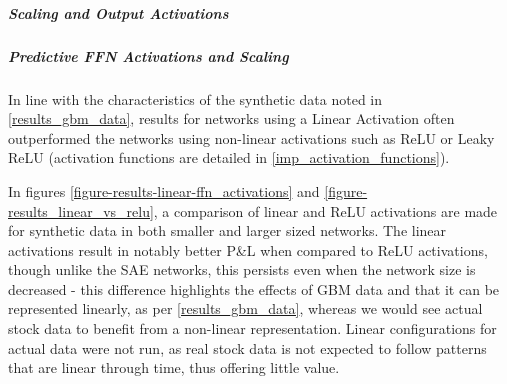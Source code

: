 \documentclass[a4paper,11pt,oneside]{article}
\theoremstyle{plain}
\theoremstyle{definition}
\begin{document}
\subparagraph{Scaling and Output Activations}\label{results_sae_activations_scaling}




















\subparagraph{Predictive FFN Activations and Scaling}

In line with the characteristics of the synthetic data noted in \ref{results_gbm_data}, results for networks using a Linear Activation often outperformed the networks using non-linear activations such as ReLU or Leaky ReLU (activation functions are detailed in \ref{imp_activation_functions}). \newline

In figures \ref{figure-results-linear-ffn_activations} and \ref{figure-results_linear_vs_relu}, a comparison of linear and ReLU activations are made for synthetic data in both smaller and larger sized networks. The linear activations result in notably better P\&L when compared to ReLU activations, though unlike the SAE networks, this persists even when the network size is decreased - this difference highlights the effects of GBM data and that it can be represented linearly, as per \ref{results_gbm_data}, whereas we would see actual stock data to benefit from a non-linear representation. Linear configurations for actual data were not run, as real stock data is not expected to follow patterns that are linear through time, thus offering little value. \newline
\end{document}
